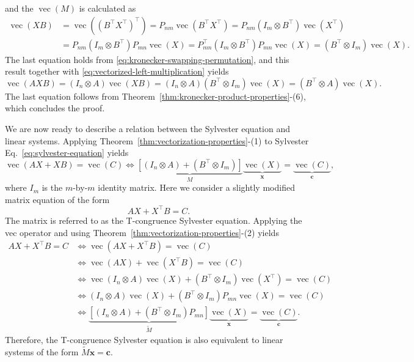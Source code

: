 \begin{Proof}
\begin{equation}
\end{equation}
{and the $\operatorname{vec}(M)$ is calculated as}
\[\begin{aligned}
\operatorname{vec}(XB)&=\operatorname{vec}((B^{\top}X^{\top})^{\top})=P_{nm}\operatorname{vec}(B^{\top}X^{\top})=P_{nm}(I_m\otimes B^{\top})\operatorname{vec}(X^{\top})\\
&=P_{nm}(I_m\otimes B^{\top})P_{mn}\operatorname{vec}(X)
=P_{mn}^{\top}(I_m\otimes B^{\top})P_{mn}\operatorname{vec}(X)=(B^{\top}\otimes I_m)\operatorname{vec}(X).
\end{aligned}\]
{The last equation holds from \eqref{eq:kronecker-swapping-permutation}, and this result together with \eqref{eq:vectorized-left-multiplication} yields}
\[\operatorname{vec}(AXB)=(I_n\otimes A)\operatorname{vec}(XB)=(I_n\otimes A)(B^{\top}\otimes I_m)\operatorname{vec}(X)=(B^{\top}\otimes A)\operatorname{vec}(X).\]
{The last equation follows from Theorem\ \ref{thm:kronecker-product-properties}-(6), which concludes the proof.}
\end{Proof}
{We are now ready to describe a relation between the Sylvester equation and linear systems. Applying Theorem\ \ref{thm:vectorization-properties}-(1) to Sylvester Eq.\ \eqref{eq:sylvester-equation} yields}
\[\operatorname{vec}(AX+XB)=\operatorname{vec}(C)\Leftrightarrow
\underbrace{[(I_n\otimes A)+(B^{\top}\otimes I_m)]}_M
\underbrace{\operatorname{vec}(X)}_{\boldsymbol{x}}=\underbrace{\operatorname{vec}(C)}_{\boldsymbol{c}},\]
{where $I_m$ is the $m$-by-$m$ identity matrix. Here we consider a slightly modified matrix equation of the form}
\[AX+X^{\top}B=C.\]
{The matrix is referred to as the T-congruence Sylvester equation. Applying the vec operator and using Theorem\ \ref{thm:vectorization-properties}-(2) yields}
\[\begin{aligned}
AX+X^{\top}B=C&\Leftrightarrow\operatorname{vec}(AX+X^{\top}B)=\operatorname{vec}(C)\\
&\Leftrightarrow\operatorname{vec}(AX)+\operatorname{vec}(X^{\top}B)=\operatorname{vec}(C)\\
&\Leftrightarrow\operatorname{vec}(I_n\otimes A)\operatorname{vec}(X)+(B^{\top}\otimes I_m)\operatorname{vec}(X^{\top})=\operatorname{vec}(C)\\
&\Leftrightarrow(I_n\otimes A)\operatorname{vec}(X)+(B^{\top}\otimes I_m)P_{mn}\operatorname{vec}(X)=\operatorname{vec}(C)\\
&\Leftrightarrow\underbrace{[(I_n\otimes A)+(B^{\top}\otimes I_m)P_{mn}]}_{\widetilde M}\underbrace{\operatorname{vec}(X)}_{\boldsymbol{x}}=\underbrace{\operatorname{vec}(C)}_{\boldsymbol{c}}.
\end{aligned}\]
{Therefore, the T-congruence Sylvester equation is also equivalent to linear systems of the form $\widetilde M\boldsymbol{x}=\boldsymbol{c}$.}
